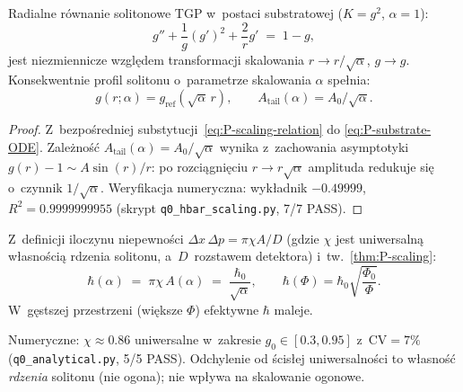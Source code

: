 \begin{theorem}%
\label{thm:P-scaling}
Radialne równanie solitonowe TGP w~postaci substratowej
($K = g^2$, $\alpha = 1$):
\begin{equation}\label{eq:P-substrate-ODE}
  g'' + \frac{1}{g}(g')^2 + \frac{2}{r}g'
  \;=\; 1 - g,
\end{equation}
jest niezmiennicze względem transformacji skalowania
$r \to r/\sqrt{\alpha}$, $g \to g$. Konsekwentnie profil solitonu
o~parametrze skalowania $\alpha$ spełnia:
\begin{equation}\label{eq:P-scaling-relation}
  g(r;\alpha) = g_{\mathrm{ref}}(\sqrt{\alpha}\, r),
  \qquad
  A_{\mathrm{tail}}(\alpha) = A_0 / \sqrt{\alpha}.
\end{equation}
\end{theorem}

\begin{proof}
Z~bezpośredniej substytucji~\eqref{eq:P-scaling-relation} do
\eqref{eq:P-substrate-ODE}. Zależność
$A_{\mathrm{tail}}(\alpha) = A_0/\sqrt{\alpha}$ wynika z~zachowania
asymptotyki $g(r) - 1 \sim A\sin(r)/r$: po rozciągnięciu
$r \to r\sqrt{\alpha}$ amplituda redukuje się o~czynnik $1/\sqrt{\alpha}$.
Weryfikacja numeryczna: wykładnik $-0.49999$, $R^2 = 0.9999999955$
(skrypt \texttt{q0\_hbar\_scaling.py}, 7/7 PASS).
\end{proof}

\begin{corollary}\label{cor:P-hbar}
Z~definicji iloczynu niepewności $\Delta x\,\Delta p = \pi\chi A/D$
(gdzie $\chi$ jest uniwersalną własnością rdzenia solitonu,
a~$D$~rozstawem detektora) i~tw.~\ref{thm:P-scaling}:
\begin{equation}\label{eq:P-hbar-scaling}
  \hbar(\alpha) \;=\; \pi\chi\,A(\alpha)
  \;=\; \frac{\hbar_0}{\sqrt{\alpha}},
  \qquad
  \hbar(\Phi) = \hbar_0\sqrt{\frac{\Phi_0}{\Phi}}.
\end{equation}
W~gęstszej przestrzeni (większe $\Phi$) efektywne $\hbar$ maleje.
\end{corollary}

\begin{remark}
Numeryczne: $\chi \approx 0.86$ uniwersalne w~zakresie
$g_0 \in [0.3, 0.95]$ z~$\mathrm{CV} = 7\%$
(\texttt{q0\_analytical.py}, 5/5 PASS).
Odchylenie od ścisłej uniwersalności to własność \emph{rdzenia}
solitonu (nie ogona); nie wpływa na skalowanie ogonowe.
\end{remark}

